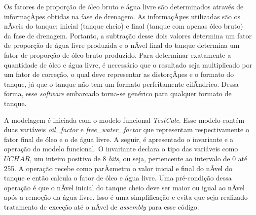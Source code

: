 \documentclass[11pt]{article} %
\begin{document}
Os fatores de proporção de óleo bruto e água livre são determinados através de informaçÃµes obtidas na
fase de drenagem. As informaçÃµes utilizadas são os nÃ­veis do tanque: inicial (tanque cheio) e final (tanque com
apenas óleo bruto) da fase de drenagem. Portanto, a subtração desse dois valores determina um fator de
proporção de água livre produzida e o nÃ­vel final do tanque determina um fator de proporção de óleo bruto
produzido. Para determinar exatamente a quantidade de óleo e água livre, é necessário que o resultado
seja multiplicado por um fator de correção, o qual deve representar as distorçÃµes e o formato do tanque,
já que o tanque não tem um formato perfeitamente cilÃ­ndrico. Dessa forma, esse \textit{software}
embarcado torna-se genérico para qualquer formato de tanque.



A modelagem é iniciada com o modelo funcional \textit{TestCalc}. Esse modelo contém duas variáveis
\textit{oil\_factor} e \textit{free\_water\_factor} que representam respectivamente o fator final de óleo e
o de água livre. A seguir, é apresentado o invariante e a operação do modelo funcional. O invariante
declara o tipo das variáveis como $\mathit{UCHAR}$, um inteiro positivo de 8 \textit{bits}, ou seja, pertencente ao
intervalo de 0 até 255. A operação recebe como parÃ¢metro o valor inicial e final do nÃ­vel do tanque e
então calcula o fator de óleo e água livre. Uma pré-condição dessa operação é que o nÃ­vel inicial do
tanque cheio deve ser maior ou igual ao nÃ­vel após a remoção da água livre. Isso é uma simplificação e 
evita que seja realizado tratamento de exceção até o nÃ­vel de \textit{assembly} para esse código.
\end{document}
